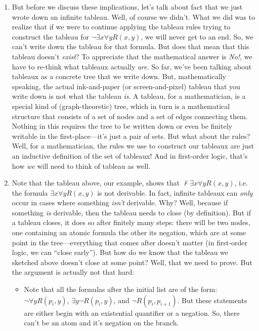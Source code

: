 \begin{enumerate}[\thesection.1]
	\item But before we discuss these implications, let's talk about fact that we just wrote down an infinite tableau. Well, of course we didn't. What we did was to realize that if we were to continue applying the tableau rules trying to construct the tableau for $\neg\exists x\forall yR(x,y)$, we will never get to an end. So, we can't write down the tableau for that formula. But does that mean that this tableau doesn't \emph{exist}? To appreciate that the mathematical answer is \emph{No!}, we have to re-think what tableaux actually \emph{are}. So far, we've been talking about tableaux as a concrete tree that we write down. But, mathematically speaking, the actual ink-and-paper (or screen-and-pixel) tableau that you write down is not what the tableau \emph{is}. A tableau, for a mathematician, is a special kind of (graph-theoretic) tree, which in turn is a mathematical structure that consists of a set of nodes and a set of edges connecting them. Nothing in this requires the tree to be written down or even be finitely writable in the first-place---it's just a pair of sets. But what about the rules? Well, for a mathematician, the rules we use to construct our tableaux are just an inductive definition of the set of tableaux! And in first-order logic, that's how \emph{we} will need to think of tableau as well.
	
	\item Note that the tableau above, our example, shows that $\nvdash\exists x\forall yR(x,y)$, i.e. the formula $\exists x\forall yR(x,y)$ is not derivable. In fact, infinite tableaux can \emph{only} occur in cases where something \emph{isn't} derivable. Why? Well, because if something \emph{is} derivable, then the tableau needs to close (by definition). But if a tableau closes, it does so after finitely many steps: there will be two nodes, one containing an atomic formula the other its negation, which are at some point in the tree---everything that comes after doesn't matter (in first-order logic, we can ``close early''). But how do we know that the tableau we sketched above doesn't close at some point? Well, that we need to prove. But the argument is actually not that hard:
	
	\begin{itemize}
	
		\item Note that all the formulas after the initial list are of the form: $\neg \forall yR(p_i, y)$, $\exists y\neg R(p_i, y)$, and $\neg R(p_i, p_{i+1})$. But these statements are either begin with an existential quantifier or a negation. So, there can't be an atom and it's negation on the branch.
		

\end{itemize}
\end{enumerate}
